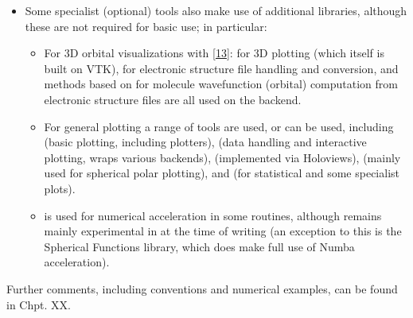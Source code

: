 \documentclass[letterpaper,table,10pt,english]{jupyterBook}
\begin{document}
\begin{itemize}
\item {} 
\sphinxAtStartPar
Some specialist (optional) tools also make use of additional libraries, although these are not required for basic use; in particular:
\begin{itemize}
\item {} 
\sphinxAtStartPar
For 3D orbital visualizations with  {[}\hyperlink{cite.backmatter/bibliography:id508}{13}{]}:  for 3D plotting (which itself is built on VTK),  for electronic structure file handling and conversion, and methods based on  for molecule wavefunction (orbital) computation from electronic structure files are all used on the backend.

\item {} 
\sphinxAtStartPar
For general plotting a range of tools are used, or can be used, including  (basic plotting, including  plotters),  (data handling and interactive plotting, wraps various backends),  (implemented via Holoviews),  (mainly used for spherical polar plotting), and  (for statistical and some specialist plots).

\item {} 
\sphinxAtStartPar
{} is used for numerical acceleration in some routines, although remains mainly experimental in  at the time of writing (an exception to this is the Spherical Functions library, which does make full use of Numba acceleration).

\end{itemize}

\end{itemize}

\sphinxAtStartPar
Further comments, including conventions and numerical examples, can be found in Chpt. XX.
\end{document}
